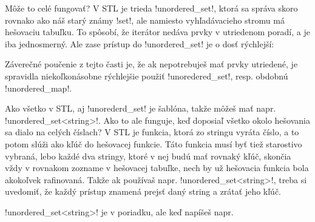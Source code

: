 {Môže to celé fungovať?  V STL je trieda \prg!unordered_set!, ktorá sa správa skoro rovnako ako
náš starý známy \prg!set!, ale namiesto vyhľadávacieho stromu má hešovaciu tabuľku. To spôsobí,
že iterátor nedáva prvky v utriedenom poradí, a je iba jednosmerný. Ale zase prístup do  
\prg!unordered_set! je o dosť rýchlejší:




Záverečné poučenie z tejto časti je, že ak nepotrebuješ mať prvky utriedené, je spravidla
niekoľkonásobne rýchlejšie použiť \prg!unoredered_set!, resp. obdobnú \prg!unordered_map!.


Ako všetko v STL, aj \prg!unorederd_set! je šablóna, takže môžeš mať napr. 
\prg!unordered_set<string>!. Ako to ale funguje, keď doposiaľ všetko okolo hešovania
sa dialo na celých číslach? V STL je funkcia, ktorá zo stringu vyráta číslo, a to potom
slúži ako kľúč do hešovacej funkcie. Táto funkcia musí byť tiež starostivo vybraná, lebo
každé dva stringy, ktoré v nej budú mať rovnaký kľúč, skončia vždy v rovnakom zozname v hešovacej 
tabuľke, nech by už hešovacia funkcia bola akokoľvek rafinovaná. Takže ak používaš napr.
\prg!unordered_set<string>!, treba si uvedomiť, že každý prístup znamená prejsť daný string
a zrátať jeho kľúč. 


\prg!unordered_set<string>! je v poriadku, ale keď napíšeš napr. 

}

